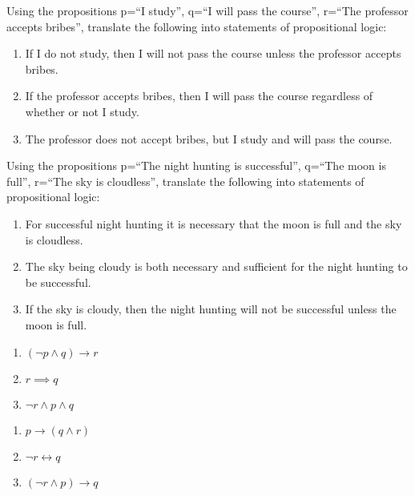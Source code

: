 \documentclass[solution, letterpaper]{cs20}
\begin{document}
        \problem{}{}

        \subproblem
        Using the propositions p=``I study'', q=``I will pass the course'', r=``The professor accepts bribes'',  translate the following into statements of propositional logic:
        	\begin{enumerate}
        	\item If I do not study, then I will not pass the course unless the professor accepts bribes.
        	\item If the professor accepts bribes, then I will pass the course regardless of whether or not I study.
        	\item The professor does not accept bribes, but I study and will pass the course.
        	\end{enumerate}


        \subproblem Using the propositions p=``The night hunting is successful'', q=``The moon is full'', r=``The sky is cloudless'', translate the following into statements of propositional logic:

        	\begin{enumerate}
        	\item For successful night hunting it is necessary that the moon is full and the sky is cloudless.
        	\item The sky being cloudy is both necessary and sufficient for the night hunting to be successful.
        	\item  If the sky is cloudy, then the night hunting will not be successful unless the moon is full.
        	\end{enumerate}

        \begin{solution}

        \subsolution

        \begin{enumerate}
        \item $(\neg p \land q) \to r$
        \item $r \implies q$
        \item $\neg r \land p \land q$
        \end{enumerate}

        \subsolution

        \begin{enumerate}
        \item $p \to (q \land r)$
        \item $\neg r \leftrightarrow q$
        \item $(\neg r \land p) \to q$
        \end{enumerate}

        \end{solution}
\end{document}
